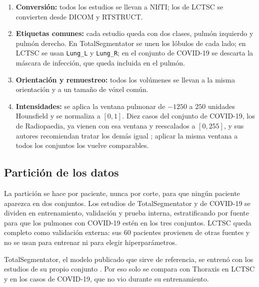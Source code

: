 \begin{enumerate}
    \item \textbf{Conversión:} todos los estudios se llevan a NIfTI; los de
          LCTSC se convierten desde DICOM y RTSTRUCT.
    \item \textbf{Etiquetas comunes:} cada estudio queda con dos clases,
          pulmón izquierdo y pulmón derecho. En TotalSegmentator se unen los
          lóbulos de cada lado; en LCTSC se usan \texttt{Lung\_L} y
          \texttt{Lung\_R}; en el conjunto de COVID-19 se descarta la máscara
          de infección, que queda incluida en el pulmón.
    \item \textbf{Orientación y remuestreo:} todos los volúmenes se llevan a
          la misma orientación y a un tamaño de vóxel común.
    \item \textbf{Intensidades:} se aplica la ventana pulmonar de $-1250$ a
          $250$ unidades Hounsfield y se normaliza a $[0, 1]$. Diez casos del
          conjunto de COVID-19, los de Radiopaedia, ya vienen con esa ventana
          y reescalados a $[0, 255]$, y sus autores recomiendan tratar los
          demás igual \parencite{ma2020}; aplicar la misma ventana a todos los
          conjuntos los vuelve comparables.
\end{enumerate}


\subsection{Partición de los datos}\label{sec:data-split}
La partición se hace por paciente, nunca por corte, para que ningún paciente
aparezca en dos conjuntos. Los estudios de TotalSegmentator y de COVID-19 se
dividen en entrenamiento, validación y prueba interna, estratificando por
fuente para que los pulmones con COVID-19 estén en los tres conjuntos. LCTSC
queda completo como validación externa: sus 60 pacientes provienen de otras
fuentes y no se usan para entrenar ni para elegir hiperparámetros.

TotalSegmentator, el modelo publicado que sirve de referencia, se entrenó con
los estudios de su propio conjunto \parencite{wasserthal2023}. Por eso solo se
compara con Thoraxis en LCTSC y en los casos de COVID-19, que no vio durante
su entrenamiento.


